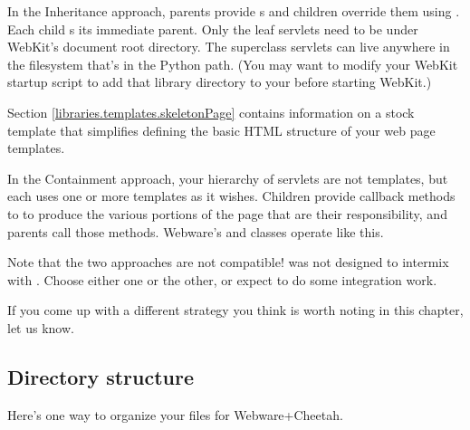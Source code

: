 In the Inheritance approach, parents provide s and children
override them using .  Each child s its immediate
parent.  Only the leaf servlets need to be under WebKit's document root
directory.  The superclass servlets can live anywhere in the filesystem
that's in the Python path.  (You may want to modify your WebKit startup 
script to add that library directory to your  before starting
WebKit.)


Section \ref{libraries.templates.skeletonPage} contains information on a stock
template that simplifies defining the basic HTML structure of your web
page templates.  

In the Containment approach, your hierarchy of servlets are not templates, but
each uses one or more templates as it wishes.  Children provide callback
methods to to produce the various portions of the page that are their
responsibility, and parents call those methods.  Webware's 
and  classes operate like this.


Note that the two approaches are not compatible!   was not
designed to intermix with .  Choose either
one or the other, or expect to do some integration work.  

If you come up with a different strategy you think is worth noting in this
chapter, let us know.


\subsection{Directory structure}
\label{webware.directoryStructure}

Here's one way to organize your files for Webware+Cheetah.

